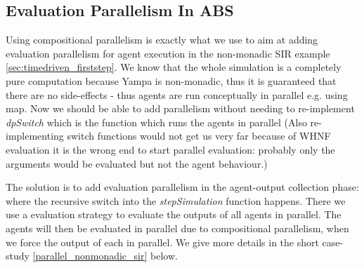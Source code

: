 \subsection{Evaluation Parallelism In ABS}
Using compositional parallelism is exactly what we use to aim at adding evaluation parallelism for agent execution in the non-monadic SIR example \ref{sec:timedriven_firststep}. We know that the whole simulation is a completely pure computation because Yampa is non-monadic, thus it is guaranteed that there are no side-effects - thus agents are run conceptually in parallel e.g. using map. Now we should be able to add parallelism without needing to re-implement \textit{dpSwitch} which is the function which runs the agents in parallel (Also re-implementing switch functions would not get us very far because of WHNF evaluation it is the wrong end to start parallel evaluation: probably only the arguments would be evaluated but not the agent behaviour.)

The solution is to add evaluation parallelism in the agent-output collection phase: where the recursive switch into the \textit{stepSimulation} function happens. There we use a evaluation strategy to evaluate the outputs of all agents in parallel. The agents will then be evaluated in parallel due to compositional parallelism, when we force the output of each in parallel. We give more details in the short case-study \ref{parallel_nonmonadic_sir} below.